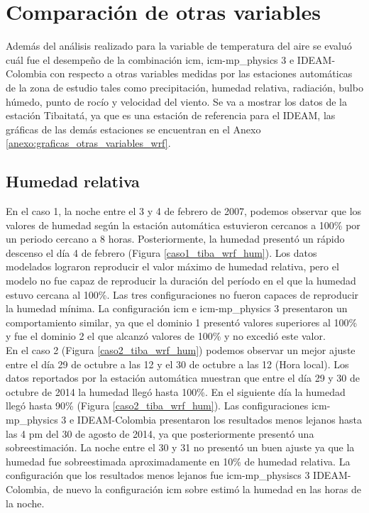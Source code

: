 \section{Comparación de otras variables}

Además del análisis realizado para la variable de temperatura del aire se evaluó cuál fue el desempeño de la combinación icm, icm-mp\_physics 3 e IDEAM-Colombia con respecto a otras variables medidas por las estaciones automáticas de la zona de estudio tales como precipitación, humedad relativa, radiación, bulbo húmedo, punto de rocío y velocidad del viento. Se va a mostrar los datos de la estación Tibaitatá, ya que es una estación de referencia para el IDEAM, las gráficas de las demás estaciones se encuentran en el Anexo \ref{anexo:graficas_otras_variables_wrf}.\\

\subsection{Humedad relativa}


En el caso 1, la noche entre el 3 y 4 de febrero de 2007, podemos observar que los valores de humedad según la estación automática estuvieron cercanos a 100\% por un periodo cercano a 8 horas. Posteriormente, la humedad presentó un rápido descenso el día 4 de febrero (Figura \ref{caso1_tiba_wrf_hum}). Los datos modelados lograron reproducir el valor máximo de humedad relativa, pero el modelo no fue capaz de reproducir la duración del período en el que la humedad estuvo cercana al 100\%. Las tres configuraciones no fueron capaces de reproducir la humedad mínima. La configuración icm e icm-mp\_physics 3 presentaron un comportamiento similar, ya que el dominio 1 presentó valores superiores al 100\% y fue el dominio 2 el que alcanzó valores de 100\% y no excedió este valor.\\

En el caso 2 (Figura \ref{caso2_tiba_wrf_hum}) podemos observar un mejor ajuste entre el día 29 de octubre a las 12 y el 30 de octubre a las 12 (Hora local). Los datos reportados por la estación automática muestran que entre el día 29 y 30 de octubre de 2014 la humedad llegó hasta 100\%. En el siguiente día la humedad llegó hasta 90\% (Figura \ref{caso2_tiba_wrf_hum}). Las configuraciones icm-mp\_physics 3 e IDEAM-Colombia presentaron los resultados menos lejanos hasta las 4 pm del 30 de agosto de 2014, ya que posteriormente presentó una sobreestimación. La noche entre el 30 y 31 no presentó un buen ajuste ya que la humedad fue sobreestimada aproximadamente en 10\% de humedad relativa. La configuración que los resultados menos lejanos fue icm-mp\_physiscs 3 IDEAM-Colombia, de nuevo la configuración icm sobre estimó la humedad en las horas de la noche.\\

